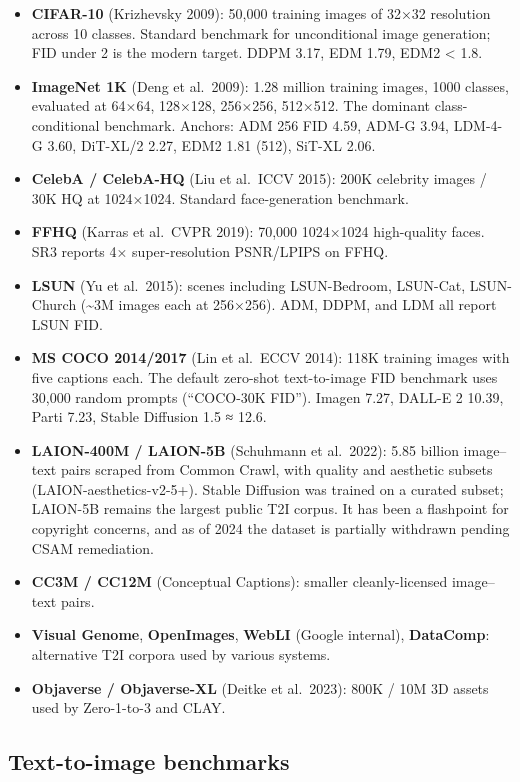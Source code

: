 \begin{itemize}
\tightlist
\item
  \textbf{CIFAR-10} (Krizhevsky 2009): 50,000 training images of 32×32 resolution across 10 classes. Standard benchmark for unconditional image generation; FID under 2 is the modern target. DDPM 3.17, EDM 1.79, EDM2 \textless{} 1.8.
\item
  \textbf{ImageNet 1K} (Deng et al.~2009): 1.28 million training images, 1000 classes, evaluated at 64×64, 128×128, 256×256, 512×512. The dominant class-conditional benchmark. Anchors: ADM 256 FID 4.59, ADM-G 3.94, LDM-4-G 3.60, DiT-XL/2 2.27, EDM2 1.81 (512), SiT-XL 2.06.
\item
  \textbf{CelebA / CelebA-HQ} (Liu et al.~ICCV 2015): 200K celebrity images / 30K HQ at 1024×1024. Standard face-generation benchmark.
\item
  \textbf{FFHQ} (Karras et al.~CVPR 2019): 70,000 1024×1024 high-quality faces. SR3 reports 4× super-resolution PSNR/LPIPS on FFHQ.
\item
  \textbf{LSUN} (Yu et al.~2015): scenes including LSUN-Bedroom, LSUN-Cat, LSUN-Church (\textasciitilde3M images each at 256×256). ADM, DDPM, and LDM all report LSUN FID.
\item
  \textbf{MS COCO 2014/2017} (Lin et al.~ECCV 2014): 118K training images with five captions each. The default zero-shot text-to-image FID benchmark uses 30,000 random prompts (``COCO-30K FID''). Imagen 7.27, DALL-E 2 10.39, Parti 7.23, Stable Diffusion 1.5 ≈ 12.6.
\item
  \textbf{LAION-400M / LAION-5B} (Schuhmann et al.~2022): 5.85 billion image--text pairs scraped from Common Crawl, with quality and aesthetic subsets (LAION-aesthetics-v2-5+). Stable Diffusion was trained on a curated subset; LAION-5B remains the largest public T2I corpus. It has been a flashpoint for copyright concerns, and as of 2024 the dataset is partially withdrawn pending CSAM remediation.
\item
  \textbf{CC3M / CC12M} (Conceptual Captions): smaller cleanly-licensed image--text pairs.
\item
  \textbf{Visual Genome}, \textbf{OpenImages}, \textbf{WebLI} (Google internal), \textbf{DataComp}: alternative T2I corpora used by various systems.
\item
  \textbf{Objaverse / Objaverse-XL} (Deitke et al.~2023): 800K / 10M 3D assets used by Zero-1-to-3 and CLAY.
\end{itemize}

\subsection{Text-to-image benchmarks}\label{text-to-image-benchmarks}

